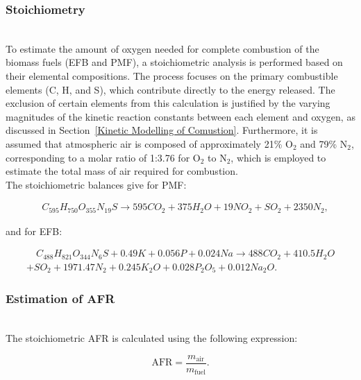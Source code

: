 \documentclass[preprint,12pt]{elsarticle}
\begin{document}


\subsubsection{Stoichiometry}
\label{Calculus of the required Oxygen for combustion}\\

To estimate the amount of oxygen needed for complete combustion of the biomass fuels (EFB and PMF), a stoichiometric analysis is performed based on their elemental compositions. The process focuses on the primary combustible elements (C, H, and S), which contribute directly to the energy released. The exclusion of certain elements from this calculation is justified by the varying magnitudes of the kinetic reaction constants between each element and oxygen, as discussed in Section~\ref{Kinetic Modelling of Comustion}. Furthermore, it is assumed that atmospheric air is composed of approximately 21\% O$_2$ and 79\% N$_2$, corresponding to a molar ratio of 1:3.76 for O$_2$ to N$_2$, which is employed to estimate the total mass of air required for combustion.\\


The stoichiometric balances give for PMF: 

\begin{multline}
    \quad C_{595}H_{750}O_{355}N_{19}S \rightarrow 
    595CO_2 + 375H_2O + 19NO_2 + SO_2 + 2350N_2,
\end{multline}

and for EFB:

\begin{multline}
    \quad C_{488}H_{821}O_{344}N_6S + 0.49K + 0.056P + 0.024Na \rightarrow 488CO_2 + 410.5H_2O\\ + SO_2 + 1971.47N_2 + 0.245K_2O + 0.028P_2O_5 + 0.012Na_2O.
\end{multline}


\subsubsection{Estimation of AFR}\\
\label{AFREST}
The stoichiometric AFR is calculated using the following expression:

\begin{equation}
    \text{AFR} = \frac{m_{\text{air}}}{m_{\text{fuel}}}.
\end{equation}
\end{document}
